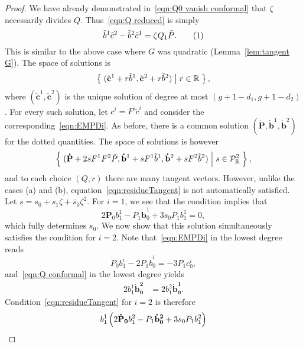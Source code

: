 \documentclass{article}
\begin{document}
\begin{lem}[Case (e)]
\begin{proof}
We have already demonstrated in~\eqref{eqn:Q0 vanish conformal} that $\zeta$ necessarily divides $Q$. Thus~\eqref{eqn:Q reduced} is simply
\[
\tilde{b}^1 \tilde{c}^2 - \tilde{b}^2 \tilde{c}^1 = \zeta Q_1\tilde{P}.
\labelthis{eqn:Q conformal}
\]
This is similar to the above case where $G$ was quadratic (Lemma~\ref{lem:tangent G}). The space of solutions is
\[
\left\{\;  (\mathbf{\tilde{c}}^1 + r \tilde{b}^1, \mathbf{\tilde{c}}^2 + r \tilde{b}^2)  \;\middle|\;  r\in \mathbb{R}  \;\right\},
\]
where $(\mathbf{\tilde{c}}^1,\mathbf{\tilde{c}}^2)$ is the unique solution of degree at most $(g+1-d_1, g+1-d_2)$. For every such solution, let $c^i = F^i\tilde{c}^i$ and consider the corresponding~\eqref{eqn:EMPDi}.
As before, there is a common solution $(\mathbf{\dot{P}}, \mathbf{\dot{b}}^1, \mathbf{\dot{b}}^2)$ for the dotted quantities. The space of solutions is however
\[
\left\{\; 
(\mathbf{\dot P} + 2s F^1F^2\tilde{P}, \mathbf{\dot b}^1 + s F^1\tilde{b}^1, \mathbf{\dot b}^2 + s F^2\tilde{b}^2)
 \;\middle|\;  s \in\mathcal{P}^2_{\mathbb{R}}  \;\right\},
\]
and to each choice $(Q,r)$ there are many tangent vectors. However, unlike the cases (a) and (b), equation~\eqref{eqn:residueTangent} is not automatically satisfied. Let $s = s_0 + s_1\zeta + \bar{s}_0 \zeta^2$. For $i=1$, we see that the condition implies that
\[
2 \mathbf{\dot{P}}_0 b^1_1 - P_1 \mathbf{\dot{b}}^1_0 + 3 s_0 P_1 b^1_1 = 0,
\]
which fully determines $s_0$. We now show that this solution simultaneously satisfies the condition for $i=2$. Note that~\eqref{eqn:EMPDi} in the lowest degree reads
\[
\dot{P}_0 b^i_1 - 2P_1\dot{b}^i_0 = -3 P_1 c^i_0,
\]
and~\eqref{eqn:Q conformal} in the lowest degree yields
\begin{align*}
2b^1_1 \mathbf{\dot{b}^2_0} &= 2 b^2_1 \mathbf{\dot{b}^1_0}.
\end{align*}
Condition~\eqref{eqn:residueTangent} for $i=2$ is therefore
\begin{align*}
b^1_1 \bra{2 \mathbf{\dot{P}_0} b^2_1 - P_1 \mathbf{\dot{b}^2_0} + 3 s_0 P_1 b^2_1}

\end{align*}
\end{proof}
\end{lem}
\end{document}
